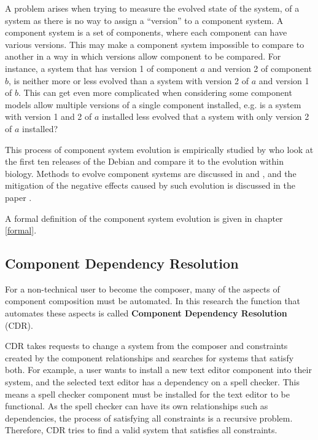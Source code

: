 A problem arises when trying to measure the evolved state of the system,  of a system as there is no way to assign a ``version'' to a component system.
A component system is a set of components, where each component can have various versions.
This may make a component system impossible to compare to another in a way in which versions allow component to be compared.
For instance, a system that has version 1 of component $a$ and version 2 of component $b$, is neither more or less evolved than a system with version 2 of $a$ and version 1 of $b$.
This can get even more complicated when considering some component models allow multiple versions of a single component installed, e.g. 
is a system with version 1 and 2 of $a$ installed less evolved that a system with only version 2 of $a$ installed?

This process of component system evolution is empirically studied by \cite{fortuna2011} 
who look at the first ten releases of the Debian and compare it to the evolution within biology.
Methods to evolve component systems are discussed in \citep{Ryan2005} and \citep{Luo2004},
and the mitigation of the negative effects caused by such evolution is discussed in the paper \citep{Stuckenholz2007}.

A formal definition of the component system evolution is given in chapter \ref{formal}.

\subsection{Component Dependency Resolution}
For a non-technical user to become the composer, many of the aspects of component composition must be automated.
In this research the function that automates these aspects is called  \textbf{Component Dependency Resolution} (CDR).

CDR takes requests to change a system from the composer and constraints created by the component relationships and searches for systems that satisfy both.
For example, a user wants to install a new text editor component into their system, and the selected text editor has a dependency on a spell checker.
This means a spell checker component must be installed for the text editor to be functional.
As the spell checker can have its own relationships such as dependencies, the process of satisfying all constraints is a recursive problem. 
Therefore, CDR tries to find a valid system that satisfies all constraints.

